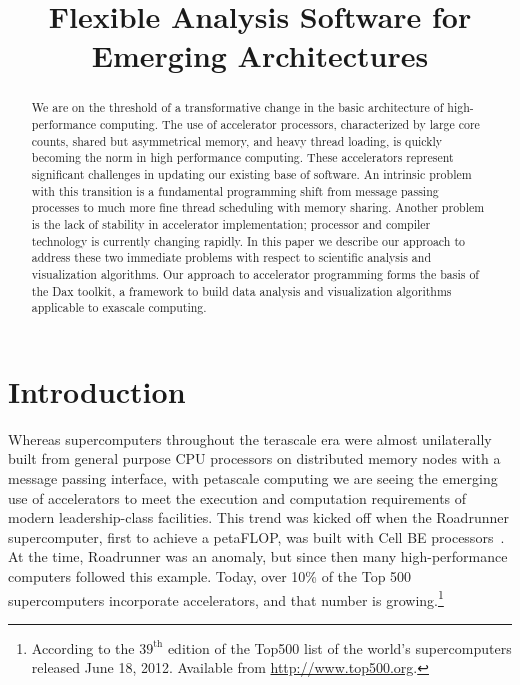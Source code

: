 \documentclass[conference]{IEEEtran}
\author{
  \IEEEauthorblockN{Kenneth~Moreland}
  \IEEEauthorblockA{Sandia National Laboratories\\
    Albuquerque, NM 87185-1326\\
    Email: kmorel@sandia.gov}
  \and
  \IEEEauthorblockN{Others}
  \IEEEauthorblockA{Cool Group\\
    Somewhere, WQ 12341\\
    Email: person@myspace.com}
}
\title{Flexible Analysis Software for Emerging Architectures}
\newcommand*{\lcite}[1]{~\cite{#1}}
\begin{document}
\sloppy

\maketitle

\begin{abstract}
  We are on the threshold of a transformative change in the basic
  architecture of high-performance computing.  The use of accelerator
  processors, characterized by large core counts, shared but asymmetrical
  memory, and heavy thread loading, is quickly becoming the norm in high
  performance computing.  These accelerators represent significant
  challenges in updating our existing base of software.  An intrinsic
  problem with this transition is a fundamental programming shift from
  message passing processes to much more fine thread scheduling with memory
  sharing.  Another problem is the lack of stability in accelerator
  implementation; processor and compiler technology is currently changing
  rapidly.  In this paper we describe our approach to address these two
  immediate problems with respect to scientific analysis and visualization
  algorithms.  Our approach to accelerator programming forms the basis of
  the Dax toolkit, a framework to build data analysis and visualization
  algorithms applicable to exascale computing.
\end{abstract}

\section{Introduction}
\label{sec:Introduction}

\noindent
Whereas supercomputers throughout the terascale era were almost
unilaterally built from general purpose CPU processors on distributed
memory nodes with a message passing interface, with petascale computing we
are seeing the emerging use of accelerators to meet the execution and
computation requirements of modern leadership-class facilities.  This trend
was kicked off when the Roadrunner supercomputer, first to achieve a
petaFLOP, was built with Cell BE processors\lcite{Henning2009}.  At the
time, Roadrunner was an anomaly, but since then many high-performance
computers followed this example.  Today, over 10\% of the Top 500
supercomputers incorporate accelerators, and that number is
growing.\footnote{According to the $39^{\mathrm{th}}$ edition of the Top500
  list of the world's supercomputers released June 18, 2012.  Available from
  \href{http://www.top500.org}{http://www.top500.org}.}
\end{document}
